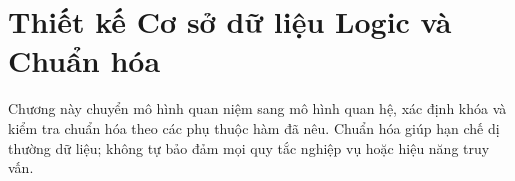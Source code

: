 \chapter{Thiết kế Cơ sở dữ liệu Logic và Chuẩn hóa}

Chương này chuyển mô hình quan niệm sang mô hình quan hệ, xác định khóa và kiểm tra chuẩn hóa theo các phụ thuộc hàm đã nêu. Chuẩn hóa giúp hạn chế dị thường dữ liệu; không tự bảo đảm mọi quy tắc nghiệp vụ hoặc hiệu năng truy vấn.





